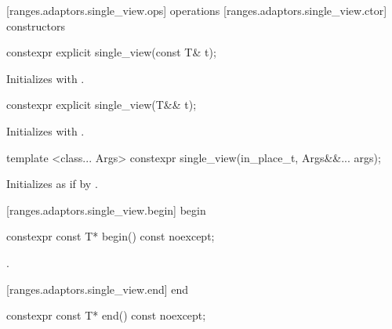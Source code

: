 [ranges.adaptors.single_view.ops]{ operations}
[ranges.adaptors.single_view.ctor]{ constructors}

%
\begin{itemdecl}
constexpr explicit single_view(const T& t);
\end{itemdecl}

\begin{itemdescr}
\pnum
\effects Initializes  with .
\end{itemdescr}

%
\begin{itemdecl}
constexpr explicit single_view(T&& t);
\end{itemdecl}

\begin{itemdescr}
\pnum
\effects Initializes  with .
\end{itemdescr}

%
\begin{itemdecl}
template <class... Args>
constexpr single_view(in_place_t, Args&&... args);
\end{itemdecl}

\begin{itemdescr}
\pnum
\effects Initializes  as if by
.
\end{itemdescr}

[ranges.adaptors.single_view.begin]{ begin}

%
\begin{itemdecl}
constexpr const T* begin() const noexcept;
\end{itemdecl}

\begin{itemdescr}
\pnum
\requires {}

\pnum
\returns {}.
\end{itemdescr}

[ranges.adaptors.single_view.end]{ end}

%
\begin{itemdecl}
constexpr const T* end() const noexcept;
\end{itemdecl}

